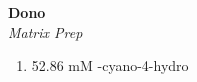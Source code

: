 \textbf{Dono} 
\\
\textit{Matrix Prep}
\begin{enumerate}
\item{52.86 mM \alpha-cyano-4-hydro}
\end{enumerate}
